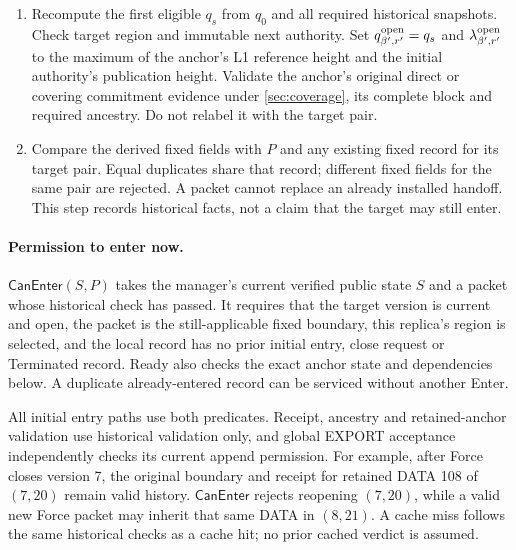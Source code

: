 \documentclass[11pt,a4paper]{article}
\newcommand{\tagg}[1]{\ensuremath{\mathsf{#1}}}
\begin{document}
\begin{enumerate}[label=(\roman*),itemsep=2pt]
anchor equality with pre-payload $G$, including prefix provenance.
During an unassigned interval, verify the stored context and any
intervening Forces rather than inventing an empty export session.
A later Force supersedes this boundary for future activation, but does
not invalidate its historical cause, original selection or retained anchor.
\item Recompute the first eligible $q_s$ from $q_0$ and all required
historical snapshots. Check target region and immutable next authority.
Set $q^{\rm open}_{\beta',r'}=q_s$ and
$\lambda^{\rm open}_{\beta',r'}$ to the maximum of the anchor's L1
reference height and the initial authority's publication height.
Validate the anchor's original direct or covering commitment evidence
under \cref{sec:coverage}, its complete block and required ancestry.
Do not relabel it with the target pair.
\item Compare the derived fixed fields with $P$ and any existing
fixed record for its target pair. Equal duplicates share that record;
different fixed fields for the same pair are rejected. A packet cannot
replace an already installed handoff. This step records historical facts,
not a claim that the target may still enter.
\end{enumerate}

\paragraph{Permission to enter now.}
\label{sec:can-enter}
$\tagg{CanEnter}(S,P)$ takes the manager's current verified public state
$S$ and a packet whose historical check has passed. It requires that the
target version is current and open, the packet is the still-applicable
fixed boundary, this replica's region is selected, and the local record
has no prior initial entry, close request or Terminated record. Ready
also checks the exact anchor state and dependencies below. A duplicate
already-entered record can be serviced without another Enter.

All initial entry paths use both predicates. Receipt, ancestry and
retained-anchor validation use historical validation only, and global
EXPORT acceptance independently checks its current append permission.
For example, after Force closes version 7, the original boundary and
receipt for retained DATA 108 of $(7,20)$ remain valid history.
$\tagg{CanEnter}$ rejects reopening $(7,20)$, while a valid new Force
packet may inherit that same DATA in $(8,21)$. A cache miss follows the
same historical checks as a cache hit; no prior cached verdict is assumed.
\end{document}
